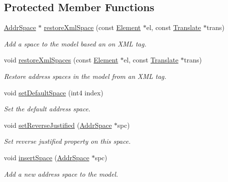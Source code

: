 \subsection*{Protected Member Functions}
\begin{DoxyCompactItemize}
\item 
\mbox{\hyperlink{class_addr_space}{Addr\+Space}} $\ast$ \mbox{\hyperlink{class_addr_space_manager_a107cb2ba1e4c562090ac1ad3b94cd16b}{restore\+Xml\+Space}} (const \mbox{\hyperlink{class_element}{Element}} $\ast$el, const \mbox{\hyperlink{class_translate}{Translate}} $\ast$trans)
\begin{DoxyCompactList}\small\item\em Add a space to the model based an on X\+ML tag. \end{DoxyCompactList}\item 
void \mbox{\hyperlink{class_addr_space_manager_a196d3c70790942337861ae7d571c5e31}{restore\+Xml\+Spaces}} (const \mbox{\hyperlink{class_element}{Element}} $\ast$el, const \mbox{\hyperlink{class_translate}{Translate}} $\ast$trans)
\begin{DoxyCompactList}\small\item\em Restore address spaces in the model from an X\+ML tag. \end{DoxyCompactList}\item 
void \mbox{\hyperlink{class_addr_space_manager_aa2804a97aa4900bf84f0c2ff064847ec}{set\+Default\+Space}} (int4 index)
\begin{DoxyCompactList}\small\item\em Set the default address space. \end{DoxyCompactList}\item 
void \mbox{\hyperlink{class_addr_space_manager_abdab85595c68e18ab86dd42af914f35b}{set\+Reverse\+Justified}} (\mbox{\hyperlink{class_addr_space}{Addr\+Space}} $\ast$spc)
\begin{DoxyCompactList}\small\item\em Set reverse justified property on this space. \end{DoxyCompactList}\item 
void \mbox{\hyperlink{class_addr_space_manager_a89658bd677414a271a918f0f37af0bd6}{insert\+Space}} (\mbox{\hyperlink{class_addr_space}{Addr\+Space}} $\ast$spc)
\begin{DoxyCompactList}\small\item\em Add a new address space to the model. \end{DoxyCompactList}\item 

\end{DoxyCompactItemize}
